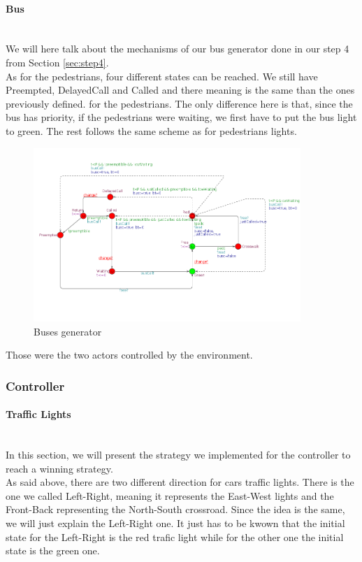 \paragraph{Bus} \mbox{}\\
We will here talk about the mechanisms of our bus generator done in our step 4 from Section \ref{sec:step4}. \\
As for the pedestrians, four different states can be reached. We still have Preempted, DelayedCall and Called and there meaning is the same than the ones previously defined. for the pedestrians. The only difference here is that, since the bus has priority, if the pedestrians were waiting, we first have to put the bus light to green. The rest follows the same scheme as for pedestrians lights.

\begin{figure}[H]\label{fig:bus}
  \centering
    \includegraphics[width=0.9\textwidth]{picture/bus.png}
    \caption{Buses generator}
\end{figure}

\noindent Those were the two actors controlled by the environment.

\subsubsection{Controller}
\paragraph{Traffic Lights} \mbox{}\\

In this section, we will present the strategy we implemented for the controller to reach a winning strategy. \\

As said above, there are two different direction for cars traffic lights. There is the one we called Left-Right, meaning it represents the East-West lights and the Front-Back representing the North-South crossroad. Since the idea is the same, we will just explain the Left-Right one. It just has to be kwown that the initial state for the Left-Right is the red trafic light while for the other one the initial state is the green one. \\


